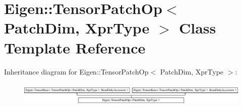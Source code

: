 \hypertarget{class_eigen_1_1_tensor_patch_op}{}\section{Eigen\+:\+:Tensor\+Patch\+Op$<$ Patch\+Dim, Xpr\+Type $>$ Class Template Reference}
\label{class_eigen_1_1_tensor_patch_op}
Inheritance diagram for Eigen\+:\+:Tensor\+Patch\+Op$<$ Patch\+Dim, Xpr\+Type $>$\+:\begin{figure}[H]
\begin{center}
\leavevmode
\includegraphics[height=1.126761cm]{class_eigen_1_1_tensor_patch_op}
\end{center}
\end{figure}
